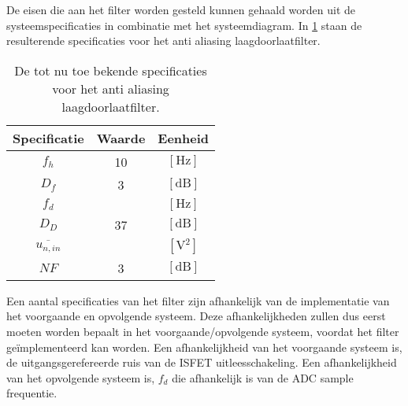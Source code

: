 De eisen die aan het filter worden gesteld kunnen gehaald worden uit de systeemspecificaties in combinatie met het systeemdiagram. In \cref{tab:prelimenarySpecsAAfilter} staan de resulterende specificaties voor het anti aliasing laagdoorlaatfilter.
\begin{table}[!htbp]
    \centering
    \begin{tabular}{c|c|c}
        Specificatie & Waarde & Eenheid \\\hline
        $f_h$ & 10 & $[\si{\hertz}]$\\
        $D_f$ & 3   & $[\mathrm{dB}]$ \\
        $f_d$ &  & $[\si{\hertz}]$ \\
        $D_D$ & 37   & $[\mathrm{dB}]$ \\
        $\overline{u_{n,in}}$ & & $[\si{\volt^2}]$\\
        $NF$ & 3 & $[\mathrm{dB}]$
    \end{tabular}
    \caption{De tot nu toe bekende specificaties voor het anti aliasing laagdoorlaatfilter.}
    \label{tab:prelimenarySpecsAAfilter}
\end{table}

Een aantal specificaties van het filter zijn afhankelijk van de implementatie van het voorgaande en opvolgende systeem. Deze afhankelijkheden zullen dus eerst moeten worden bepaalt in het voorgaande/opvolgende systeem, voordat het filter geïmplementeerd kan worden. Een afhankelijkheid van het voorgaande systeem is, de uitgangsgerefereerde ruis van de ISFET uitleesschakeling.
Een afhankelijkheid van het opvolgende systeem is, $f_d$ die afhankelijk is van de ADC sample frequentie.